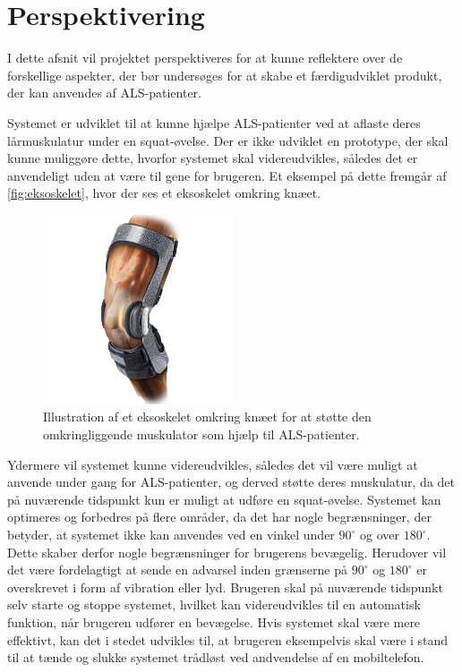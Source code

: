 \section{Perspektivering}
I dette afsnit vil projektet perspektiveres for at kunne reflektere over de forskellige aspekter, der bør undersøges for at skabe et færdigudviklet produkt, der kan anvendes af ALS-patienter. 

Systemet er udviklet til at kunne hjælpe ALS-patienter ved at aflaste deres lårmuskulatur under en squat-øvelse. Der er ikke udviklet en prototype, der skal kunne muliggøre dette, hvorfor systemet skal videreudvikles, således det er anvendeligt uden at være til gene for brugeren. Et eksempel på dette fremgår af \autoref{fig:eksoskelet}, hvor der ses et eksoskelet omkring knæet. 

\begin{figure}[H]
\centering
\includegraphics[width=0.5\textwidth]{figures/eksoskelet}
\caption{Illustration af et eksoskelet omkring knæet for at støtte den omkringliggende muskulator som hjælp til ALS-patienter.}
\label{fig:eksoskelet}
\end{figure}

Ydermere vil systemet kunne videreudvikles, således det vil være muligt at anvende under gang for ALS-patienter, og derved støtte deres muskulatur, da det på nuværende tidspunkt kun er muligt at udføre en squat-øvelse. Systemet kan optimeres og forbedres på flere områder, da det har nogle begrænsninger, der betyder, at systemet ikke kan anvendes ved en vinkel under $90^{\circ}$ og over $180^{\circ}$. Dette skaber derfor nogle begrænsninger for brugerens bevægelig. Herudover vil det være fordelagtigt at sende en advarsel inden grænserne på $90^{\circ}$ og $180^{\circ}$ er overskrevet i form af vibration eller lyd. Brugeren skal på nuværende tidspunkt selv starte og stoppe systemet, hvilket kan videreudvikles til en automatisk funktion, når brugeren udfører en bevægelse. Hvis systemet skal være mere effektivt, kan det i stedet udvikles til, at brugeren eksempelvis skal være i stand til at tænde og slukke systemet trådløst ved andvendelse af en mobiltelefon. 

